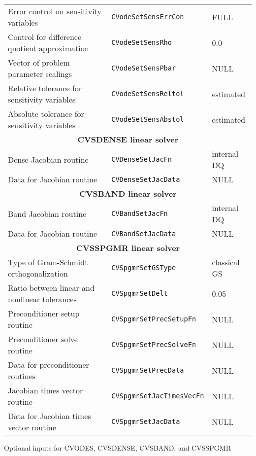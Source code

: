 \begin{acmtable}{\textwidth}
\begin{tabularx}{\textwidth}{lll}
Error control on sensitivity variables & {\tt CVodeSetSensErrCon} & FULL \\
Control for difference quotient approximation & {\tt CVodeSetSensRho}   & 0.0 \\
Vector of problem parameter scalings & {\tt CVodeSetSensPbar}  & NULL \\
Relative tolerance for sensitivity variables & {\tt CVodeSetSensReltol} & estimated \\
Absolute tolerance for sensitivity variables & {\tt CVodeSetSensAbstol} & estimated \\
\hline
\multicolumn{3}{c}{\bf CVSDENSE linear solver} \\
\hline
Dense Jacobian routine & {\tt CVDenseSetJacFn} & internal DQ \\
Data for Jacobian routine & {\tt CVDenseSetJacData} & NULL \\
\hline
\multicolumn{3}{c}{\bf CVSBAND linear solver} \\
\hline
Band Jacobian routine & {\tt CVBandSetJacFn} & internal DQ \\
Data for Jacobian routine & {\tt CVBandSetJacData} & NULL \\
\hline
\multicolumn{3}{c}{\bf CVSSPGMR linear solver} \\
\hline
Type of Gram-Schmidt orthogonalization & {\tt CVSpgmrSetGSType} & classical GS \\
Ratio between linear and nonlinear tolerances & {\tt CVSpgmrSetDelt} & 0.05 \\
Preconditioner setup routine & {\tt CVSpgmrSetPrecSetupFn} & NULL \\
Preconditioner solve routine & {\tt CVSpgmrSetPrecSolveFn} & NULL \\
Data for preconditioner routines & {\tt CVSpgmrSetPrecData} & NULL \\
Jacobian times vector routine & {\tt CVSpgmrSetJacTimesVecFn} & NULL \\
Data for Jacobian times vector routine &{\tt CVSpgmrSetJacData} & NULL \\
\end{tabularx}
\caption{Optional inputs for CVODES, CVSDENSE, CVSBAND, and CVSSPGMR}
\label{t:optional_inputs}
\end{acmtable}
%
%

